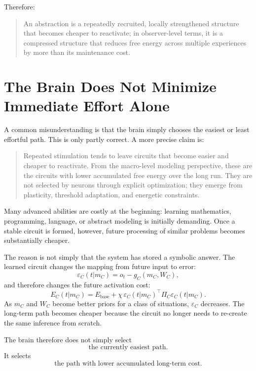 \documentclass[11pt, a4paper]{article}
\begin{document}
Therefore:
\begin{quote}
An abstraction is a repeatedly recruited, locally strengthened structure that becomes cheaper to reactivate; in observer-level terms, it is a compressed structure that reduces free energy across multiple experiences by more than its maintenance cost.
\end{quote}

\section{The Brain Does Not Minimize Immediate Effort Alone}

A common misunderstanding is that the brain simply chooses the easiest or least effortful path. This is only partly correct. A more precise claim is:

\begin{quote}
Repeated stimulation tends to leave circuits that become easier and cheaper to reactivate. From the macro-level modeling perspective, these are the circuits with lower accumulated free energy over the long run. They are not selected by neurons through explicit optimization; they emerge from plasticity, threshold adaptation, and energetic constraints.
\end{quote}

Many advanced abilities are costly at the beginning: learning mathematics, programming, language, or abstract modeling is initially demanding. Once a stable circuit is formed, however, future processing of similar problems becomes substantially cheaper.

The reason is not simply that the system has stored a symbolic answer. The learned circuit changes the mapping from future input to error:
\begin{equation}
\varepsilon_C(t|m_C)
=
o_t-g_C(m_C,W_C),
\end{equation}
and therefore changes the future activation cost:
\begin{equation}
E_C(t|m_C)
=
E_{\mathrm{base}}
+
\chi\,\varepsilon_C(t|m_C)^\top\Pi_C\varepsilon_C(t|m_C).
\end{equation}
As $m_C$ and $W_C$ become better priors for a class of situations, $\varepsilon_C$ decreases. The long-term path becomes cheaper because the circuit no longer needs to re-create the same inference from scratch.

The brain therefore does not simply select
\begin{equation}
\text{the currently easiest path}.
\end{equation}
It selects
\begin{equation}
\text{the path with lower accumulated long-term cost}.
\end{equation}
\end{document}
